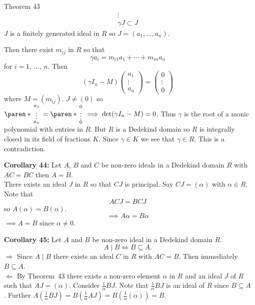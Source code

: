 Theorem 43
\begin{gather*}
\vdots \\
\gamma J \subset J
\end{gather*}
$J$ is a finitely generated ideal in $R$ so $J=(a_1,\dotsc,a_n)$.

Then there exist $m_{ij}$ in $R$ so that
\[ \gamma a_i = m_{i1}a_1 + \dotsb + m_{in}a_n \]
for $i=1$, $\dotsc$, $n$.  Then
\[ (\gamma I_n - M)\begin{pmatrix}
a_1 \\
\vdots \\
a_n
\end{pmatrix} = \begin{pmatrix}0 \\
\vdots \\
0
\end{pmatrix} \]
where $M=(m_{ij})$.  $J\neq(0)$ so $\paren*{\begin{smallmatrix}
a_1 \\
\vdots \\
a_n
\end{smallmatrix}} = \paren*{\begin{smallmatrix}0 \\
\vdots \\
0
\end{smallmatrix}}\implies\det(\gamma I_n-M)=0$.  Thus $\gamma$ is the root of a monic polynomial with entries in $R$.  But $R$ is a Dedekind domain so $R$ is integrally closed in its field of fractions $K$.  Since $\gamma\in K$ we see that $\gamma\in R$.  This is a contradiction.

\textbf{Corollary 44:} Let $A$, $B$ and $C$ be non-zero ideals in a Dedekind domain $R$ with $AC=BC$ then $A=B$. \\
\pf There exists an ideal $J$ in $R$ so that $CJ$ is principal.  Say $CJ=(\alpha)$ with $\alpha\in R$.  Note that
\[ ACJ = BCJ \]
so $A(\alpha)=B(\alpha)$.
\[ \implies A\alpha = B\alpha \]
$\implies A=B$ since $\alpha\neq0$.

\textbf{Corollary 45:} Let $A$ and $B$ be non-zero ideal in a Dedekind domain $R$.
\[ A \mid B \iff B \subseteq A . \]
\pf $\Rightarrow$ Since $A\mid B$ there exists an ideal $C$ in $R$ with $AC=B$.  Then immediately $B\subseteq A$. \\
$\Leftarrow$ By Theorem~43 there exists a non-zero element $\alpha$ in $R$ and an ideal $J$ of $R$ such that $AJ=(\alpha)$.  Consider $\frac{1}{\alpha}BJ$.  Note that $\frac{1}{\alpha}BJ$ is an ideal of $R$ since $B\subseteq A$.  Further $A(\frac{1}{\alpha}BJ)=B(\frac{1}{\alpha}AJ)=B(\frac{1}{\alpha}(\alpha))=B$.

